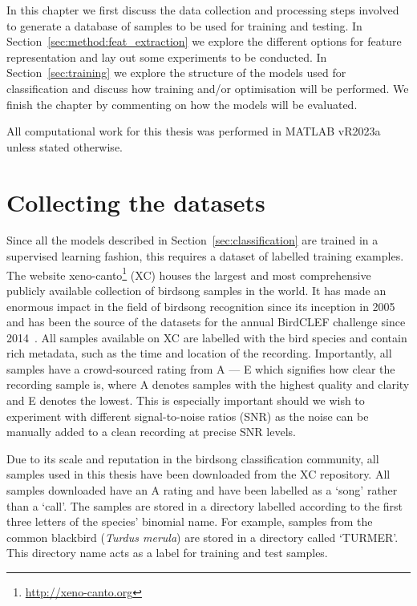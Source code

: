 In this chapter we first discuss the data collection and processing steps
involved to generate a database of samples to be used for training and testing.
In Section~\ref{sec:method:feat_extraction} we explore the different options for
feature representation and lay out some experiments to be conducted. In
Section~\ref{sec:training} we explore the structure of the models used for
classification and discuss how training and/or optimisation will be performed.
We finish the chapter by commenting on how the models will be evaluated.

All computational work for this thesis was performed in MATLAB vR2023a
unless stated otherwise.

\section{Collecting the datasets}

Since all the models described in Section~\ref{sec:classification} are trained
in a supervised learning fashion, this requires a dataset of labelled training
examples. The website xeno-canto\footnote{\url{http://xeno-canto.org}} (XC) houses the
largest and most comprehensive publicly available collection of birdsong samples
in the world. It has made an enormous impact in the field of birdsong recognition
since its inception in 2005 and has been the source of the datasets for the
annual BirdCLEF challenge since 2014~\cite{vellinga2015xeno}. All samples
available on XC are labelled with the bird species and contain rich metadata,
such as the time and location of the recording. Importantly, all samples have a
crowd-sourced rating from A --- E which signifies how clear the recording sample
is, where A denotes samples with the highest quality and clarity and E denotes
the lowest. This is especially important should we wish to experiment with
different signal-to-noise ratios (SNR) as the noise can be manually added to a
clean recording at precise SNR levels.

Due to its scale and reputation in the birdsong classification community, all
samples used in this thesis have been downloaded from the XC repository. All
samples downloaded have an A rating and have been labelled as a `song' rather
than a `call'. The samples are stored in a directory labelled according to the
first three letters of the species' binomial name. For example, samples from the
common blackbird (\textit{Turdus merula}) are stored in a directory called
`TURMER'. This directory name acts as a label for training and test samples.

